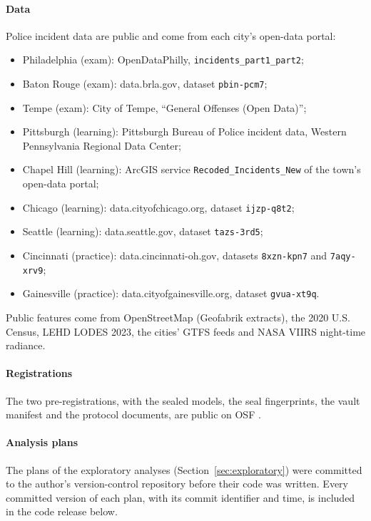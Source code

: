 \documentclass[preprint,12pt,authoryear]{elsarticle}
\begin{document}
\paragraph{Data} Police incident data are public and come from each city's open-data portal:
\begin{itemize}
  \item Philadelphia (exam): OpenDataPhilly, \texttt{incidents\_part1\_part2};
  \item Baton Rouge (exam): data.brla.gov, dataset \texttt{pbin-pcm7};
  \item Tempe (exam): City of Tempe, ``General Offenses (Open Data)'';
  \item Pittsburgh (learning): Pittsburgh Bureau of Police incident data, Western Pennsylvania Regional Data Center;
  \item Chapel Hill (learning): ArcGIS service \texttt{Recoded\_Incidents\_New} of the town's open-data portal;
  \item Chicago (learning): data.cityofchicago.org, dataset \texttt{ijzp-q8t2};
  \item Seattle (learning): data.seattle.gov, dataset \texttt{tazs-3rd5};
  \item Cincinnati (practice): data.cincinnati-oh.gov, datasets \texttt{8xzn-kpn7} and \texttt{7aqy-xrv9};
  \item Gainesville (practice): data.cityofgainesville.org, dataset \texttt{gvua-xt9q}.
\end{itemize}
Public features come from OpenStreetMap (Geofabrik extracts), the 2020 U.S. Census, LEHD LODES 2023, the cities' GTFS feeds and NASA VIIRS night-time radiance.

\paragraph{Registrations} The two pre-registrations, with the sealed models, the seal fingerprints, the vault manifest and the protocol documents, are public on OSF \citep{osf_main,osf_tempe}.

\paragraph{Analysis plans} The plans of the exploratory analyses (Section~\ref{sec:exploratory}) were committed to the author's version-control repository before their code was written. Every committed version of each plan, with its commit identifier and time, is included in the code release below.
\end{document}
